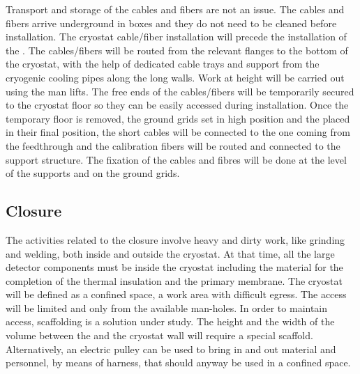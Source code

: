 Transport and storage of the cables and fibers are not an issue.
The cables and fibers arrive underground in boxes and they do not need to be cleaned before installation.
The cryostat cable/fiber installation will precede the installation of the .
The cables/fibers will be routed from the relevant flanges to the bottom of the cryostat, with the help of dedicated cable trays and support from the cryogenic cooling pipes along the long walls.
Work at height will be carried out using the man lifts.
The free ends of the cables/fibers will be temporarily secured to the cryostat floor so they can be easily accessed during installation.
Once the temporary floor is removed, the ground grids set in high position and the  placed in their final position, the short  cables will be connected to the one coming from the feedthrough and the calibration fibers will be routed and connected to the support structure.
The fixation of the cables and fibres will be done at the level of the  supports and on the ground grids.

\subsection{ Closure}
The activities related to the  closure involve heavy and dirty work, like grinding and welding, both inside and outside the cryostat.
At that time, all the large detector components must be inside the cryostat including the material for the completion of the thermal insulation and the primary membrane.
The cryostat will be defined as a confined space, a work area with difficult egress.
The access will be limited and only from the available man-holes.
In order to maintain access, scaffolding is a solution under study.
The height and the width of the volume between the  and the cryostat wall will require a special scaffold.
Alternatively, an electric pulley can be used to bring in and out material and personnel, by means of harness, that should anyway be used in a confined space.

